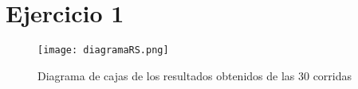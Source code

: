 \section*{Ejercicio 1}

\begin{figure}[h]
	\texttt{[image: diagramaRS.png]}
	\caption{Diagrama de cajas de los resultados obtenidos de las 30 corridas}
\end{figure}
